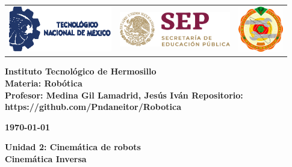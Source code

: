\begin{titlepage}
	\centering
	\begin{tabular}{@{}p{} p{} p{}@{}}
		\includegraphics[height=2cm]{tecnm} & 
		\centering \includegraphics[height=1.5cm]{SEP} & 
		\raggedleft \includegraphics[height=2cm]{ith.jpg} \\
	\end{tabular}
	
	\vspace{2em}
	
	\noindent
	\begin{minipage}[t]{0.48\textwidth}
		\raggedright
		\small \textbf{%
			Instituto Tecnológico de Hermosillo\\
			Materia: Robótica\\
			Profesor: Medina Gil Lamadrid, Jesús Iván
			Repositorio: https://github.com/Pndaneitor/Robotica%
		}
	\end{minipage}%
	\hfill
	\begin{minipage}[t]{0.48\textwidth}
		\raggedleft
		\small \textbf{\today}
	\end{minipage}
	
	\vspace{2em}
	
	{\large \textbf{Unidad 2: Cinemática de robots}}\\
		\vspace{1em}
	{\Huge \textbf{Cinemática Inversa
}}
		

\end{titlepage}
